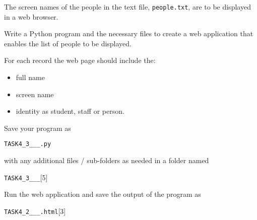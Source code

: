 The screen names of the people in the text file, \texttt{people.txt},
are to be displayed in a web browser.

Write a Python program and the necessary files to create a web application
that enables the list of people to be displayed.

For each record the web page should include the:
\begin{itemize}
\item full name
\item screen name
\item identity as student, staff or person.
\end{itemize}
Save your program as

\begin{onehalfspace}
\noindent \texttt{TASK4\_3\_<your name>\_<centre number>\_<index number>.py}
\end{onehalfspace}

with any additional files / sub-folders as needed in a folder named

\begin{onehalfspace}
\noindent \texttt{TASK4\_3\_<your name>\_<centre number>\_<index number>}\hfill{}{[}5{]}
\end{onehalfspace}

Run the web application and save the output of the program as 

\begin{onehalfspace}
\noindent \texttt{TASK4\_2\_<your name>\_<centre number>\_<index number>.html}\hfill{}{[}3{]}
\end{onehalfspace}